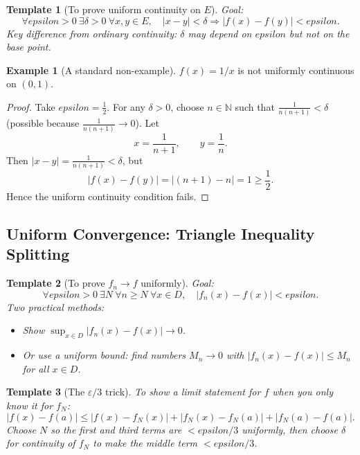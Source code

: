 \documentclass[12pt]{article}
\numberwithin{equation}{section}
\def\eps{epsilon}
\newcommand{\NN}{\mathbb{N}}
\newcommand{\eps}{\varepsilon}               %
\theoremstyle{plain}
\newtheorem{template}{Template}[section]
\theoremstyle{definition}
\newtheorem{example}[theorem]{Example}
\theoremstyle{remark}
\begin{document}
\begin{template}[To prove uniform continuity on $E$]\label{tmp:unif-cont}
Goal:
\[
\forall \eps>0\ \exists \delta>0\ \forall x,y\in E,\quad |x-y|<\delta \Rightarrow |f(x)-f(y)|<\eps.
\]
Key difference from ordinary continuity: $\delta$ may depend on $\eps$ but \emph{not} on the base point.
\end{template}

\begin{example}[A standard non-example]\label{ex:app_not_unif}
$f(x)=1/x$ is not uniformly continuous on $(0,1)$.
\end{example}

\begin{proof}
Take $\eps=\tfrac12$.
For any $\delta>0$, choose $n\in\NN$ such that $\frac{1}{n(n+1)}<\delta$
(possible because $\frac{1}{n(n+1)}\to 0$).
Let
\[
x=\frac{1}{n+1},\qquad y=\frac{1}{n}.
\]
Then $|x-y|=\frac{1}{n(n+1)}<\delta$, but
\[
|f(x)-f(y)|=\left|(n+1)-n\right|=1\ge \frac12.
\]
Hence the uniform continuity condition fails.
\end{proof}

\subsection{Uniform Convergence: Triangle Inequality Splitting}

\begin{template}[To prove $f_n\to f$ uniformly]\label{tmp:unif-conv}
Goal:
\[
\forall \eps>0\ \exists N\ \forall n\ge N\ \forall x\in D,\quad |f_n(x)-f(x)|<\eps.
\]
Two practical methods:
\begin{itemize}
\item Show $\displaystyle \sup_{x\in D}|f_n(x)-f(x)|\to 0$.
\item Or use a uniform bound: find numbers $M_n\to 0$ with $|f_n(x)-f(x)|\le M_n$ for all $x\in D$.
\end{itemize}
\end{template}

\begin{template}[The $\varepsilon/3$ trick]\label{tmp:eps3}
To show a limit statement for $f$ when you only know it for $f_N$:
\[
|f(x)-f(a)|
\le |f(x)-f_N(x)|+|f_N(x)-f_N(a)|+|f_N(a)-f(a)|.
\]
Choose $N$ so the first and third terms are $<\eps/3$ uniformly, then choose $\delta$ for continuity of $f_N$ to make the middle term $<\eps/3$.
\end{template}
\end{document}
